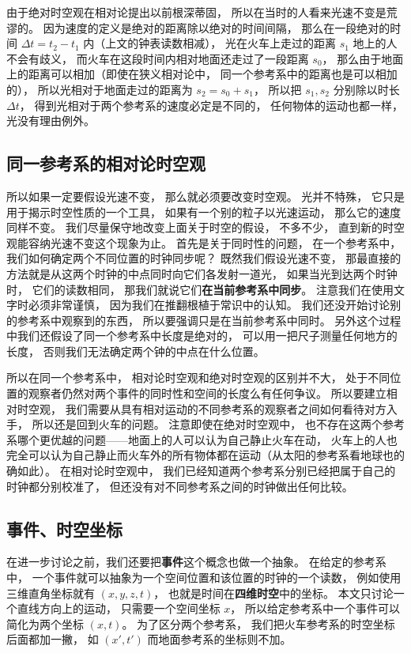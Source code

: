 由于绝对时空观在相对论提出以前根深蒂固， 所以在当时的人看来光速不变是荒谬的。 因为速度的定义是绝对的距离除以绝对的时间间隔， 那么在一段绝对的时间 $\Delta t = t_2 - t_1$ 内（上文的钟表读数相减）， 光在火车上走过的距离 $s_1$ 地上的人不会有歧义， 而火车在这段时间内相对地面还走过了一段距离 $s_0$， 那么由于地面上的距离可以相加（即使在狭义相对论中， 同一个参考系中的距离也是可以相加的）， 所以光相对于地面走过的距离为 $s_2 = s_0 + s_1$， 所以把 $s_1, s_2$ 分别除以时长 $\Delta t$， 得到光相对于两个参考系的速度必定是不同的， 任何物体的运动也都一样， 光没有理由例外。

\subsection{同一参考系的相对论时空观}
所以如果一定要假设光速不变， 那么就必须要改变时空观。 光并不特殊， 它只是用于揭示时空性质的一个工具， 如果有一个别的粒子以光速运动， 那么它的速度同样不变。 我们尽量保守地改变上面关于时空的假设， 不多不少， 直到新的时空观能容纳光速不变这个现象为止。 首先是关于同时性的问题， 在一个参考系中， 我们如何确定两个不同位置的时钟同步呢？ 既然我们假设光速不变， 那最直接的方法就是从这两个时钟的中点同时向它们各发射一道光， 如果当光到达两个时钟时， 它们的读数相同， 那我们就说它们\textbf{在当前参考系中同步}。 注意我们在使用文字时必须非常谨慎， 因为我们在推翻根植于常识中的认知。 我们还没开始讨论别的参考系中观察到的东西， 所以要强调只是在当前参考系中同时。 另外这个过程中我们还假设了同一个参考系中长度是绝对的， 可以用一把尺子测量任何地方的长度， 否则我们无法确定两个钟的中点在什么位置。

所以在同一个参考系中， 相对论时空观和绝对时空观的区别并不大， 处于不同位置的观察者仍然对两个事件的同时性和空间的长度么有任何争议。 所以要建立相对时空观， 我们需要从具有相对运动的不同参考系的观察者之间如何看待对方入手， 所以还是回到火车的问题。 注意即使在绝对时空观中， 也不存在这两个参考系哪个更优越的问题——地面上的人可以认为自己静止火车在动， 火车上的人也完全可以认为自己静止而火车外的所有物体都在运动（从太阳的参考系看地球也的确如此）。 在相对论时空观中， 我们已经知道两个参考系分别已经把属于自己的时钟都分别校准了， 但还没有对不同参考系之间的时钟做出任何比较。

\subsection{事件、时空坐标}
在进一步讨论之前，我们还要把\textbf{事件}这个概念也做一个抽象。 在给定的参考系中， 一个事件就可以抽象为一个空间位置和该位置的时钟的一个读数， 例如使用三维直角坐标就有 $(x, y, z, t)$， 也就是时间在\textbf{四维时空}中的坐标。 本文只讨论一个直线方向上的运动， 只需要一个空间坐标 $x$， 所以给定参考系中一个事件可以简化为两个坐标 $(x, t)$。 为了区分两个参考系， 我们把火车参考系的时空坐标后面都加一撇， 如 $(x', t')$ 而地面参考系的坐标则不加。

